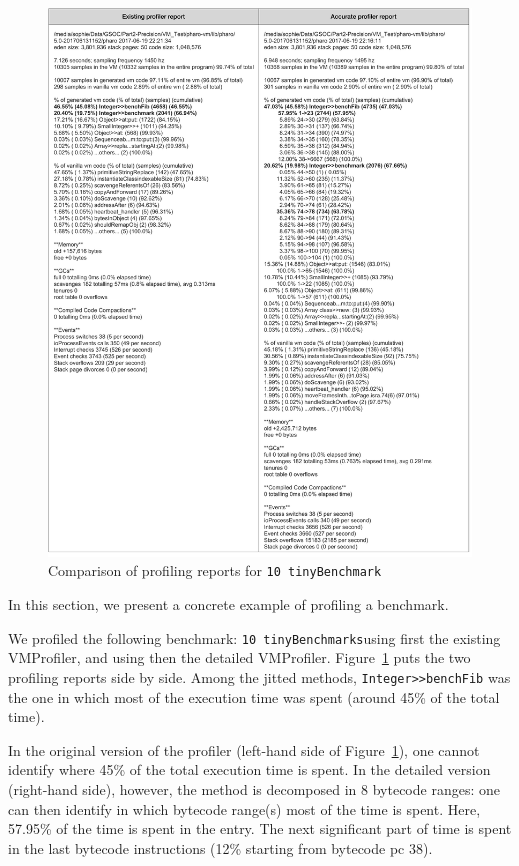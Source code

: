 \documentclass[10pt,nonatbib]{sigplanconf}
\newcommand{\ct}{\lstinline[backgroundcolor=\color{white},basicstyle=\small\ttfamily]}
\newcommand{\figlabel}[1]{\label{fig:#1}}
\newcommand{\figref}[1]{Figure~\ref{fig:#1}}
\begin{document}
  \begin{figure}[!htp]
     \begin{center}
         \includegraphics[width=1.0\linewidth]{ReportComparison}
         \caption{Comparison of profiling reports for \ct{10 tinyBenchmark}}
         \figlabel{fig:ReportComparison}
     \end{center}
 \end{figure}

In this section, we present a concrete example of profiling a benchmark.

We profiled the following benchmark: \ct{10 tinyBenchmarks}using first the existing VMProfiler, and using then the detailed VMProfiler. 
\figref{fig:ReportComparison} puts the two profiling reports side by side.
Among the jitted methods, \ct{Integer>>benchFib} was the one in which most of the execution time was spent (around 45\% of the total time).

In the original version of the profiler (left-hand side of \figref{fig:ReportComparison}), one cannot identify where 45\% of the total execution time is spent. In the detailed version (right-hand side), however, the method is decomposed in 8 bytecode ranges: one can then identify in which bytecode range(s) most of the time is spent. Here, 57.95\% of the time is spent in the entry. The next significant part of time is spent in the last bytecode instructions (12\% starting from bytecode pc 38).
\end{document}
